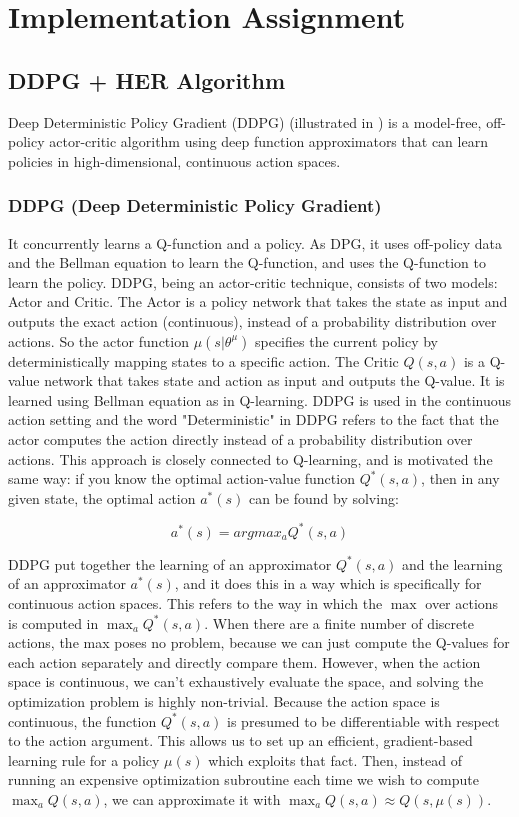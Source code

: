 \documentclass[a4paper]{report}
\begin{document}
\chapter{Implementation Assignment}

\section{DDPG + HER Algorithm}
Deep Deterministic Policy Gradient (DDPG) (illustrated in \cite{ddpg}) is a model-free, off-policy actor-critic algorithm using deep function approximators that can learn policies in high-dimensional, continuous action spaces.

\subsection{DDPG (Deep Deterministic Policy Gradient)}
It concurrently learns a Q-function and a policy. As DPG, it uses off-policy data and the Bellman equation to learn the Q-function, and uses the Q-function to learn the policy. DDPG, being an actor-critic technique, consists of two models: Actor and Critic. The Actor is a policy network that takes the state as input and outputs the exact action (continuous), instead of a probability distribution over actions. So the actor function $\mu(s|\theta^{\mu})$ specifies the current policy by deterministically mapping states to a specific action. The Critic $Q(s,a)$ is a Q-value network that takes state and action as input and outputs the Q-value. It is learned using Bellman equation as in Q-learning. DDPG is used in the continuous action setting and the word "Deterministic" in DDPG refers to the fact that the actor computes the action directly instead of a probability distribution over actions. This approach is closely connected to Q-learning, and is motivated the same way: if you know the optimal action-value function $Q^*(s,a)$, then in any given state, the optimal action $a^*(s)$ can be found by solving:

\begin{equation}
a^*(s) = argmax_a Q^*(s, a)
\end{equation} 

DDPG put together the learning of an approximator $Q^*(s, a)$ and the learning of an approximator $a^*(s)$, and it does this in a way which is specifically for continuous action spaces. This refers to the way in which the $\max$ over actions is computed in $\max_a Q^*(s, a)$. When there are a finite number of discrete actions, the max poses no problem, because we can just compute the Q-values for each action separately and directly compare them. However, when the action space is continuous, we can't exhaustively evaluate the space, and solving the optimization problem is highly non-trivial. Because the action space is continuous, the function $Q^*(s,a)$ is presumed to be differentiable with respect to the action argument. This allows us to set up an efficient, gradient-based learning rule for a policy $\mu(s)$ which exploits that fact. Then, instead of running an expensive optimization subroutine each time we wish to compute $\max_a Q(s,a)$, we can approximate it with $\max_a Q(s,a) \approx Q(s,\mu(s))$.
\end{document}
